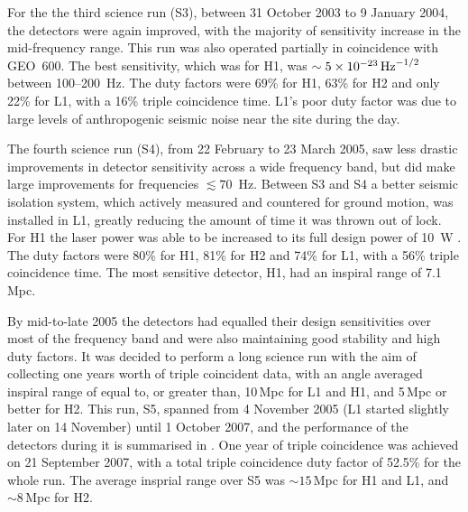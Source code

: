 \documentclass{article}
\begin{document}
For the the third science run (S3), between 31 October 2003 to 9 January 2004,
the detectors were again improved, with the majority of sensitivity increase in
the mid-frequency range. This run was also operated partially in coincidence
with GEO~600. The best sensitivity, which was for H1, was
$\sim5\times10^{-23}\,{\rm Hz}^{-1/2}$ between 100--200~Hz. The duty factors
were 69\% for H1, 63\% for H2 and only 22\% for L1, with a 16\% triple
coincidence time. L1's poor duty factor was due to large levels of anthropogenic
seismic noise near the site during the day.

The fourth science run (S4), from 22 February to 23 March 2005, saw less drastic
improvements in detector sensitivity across a wide frequency band, but did make
large improvements for frequencies $\lesssim 70$~Hz. Between S3 and S4 a better
seismic isolation system, which actively measured and countered for ground
motion, was installed in L1, greatly reducing the amount of time
it was thrown out of lock. For H1 the laser power was able to be increased to 
its full design power of 10~W \cite{Abbott:2007b}. The duty factors were 80\% for H1,
81\% for H2 and 74\% for L1, with a 56\% triple coincidence time. The most
sensitive detector, H1, had an inspiral range of 7.1\,Mpc.

By mid-to-late 2005 the detectors had equalled their design sensitivities over
most of the frequency band and were also maintaining good stability and high
duty factors. It was decided to perform a long science run with the aim of
collecting one years worth of triple coincident data, with an angle averaged
inspiral range of equal to, or greater than, 10\,Mpc for L1 and H1, and 5\,Mpc
or better for H2. This run, S5, spanned from 4 November 2005 (L1 started
slightly later on 14 November) until 1 October 2007, and the performance of the
detectors during it is summarised in \cite{LIGOS5}. One year of triple
coincidence was achieved on 21 September 2007, with a total triple coincidence
duty factor of 52.5\% for the whole run. The average insprial range over S5
was $\sim15$\,Mpc for H1 and L1, and $\sim8$\,Mpc for H2.
\end{document}
